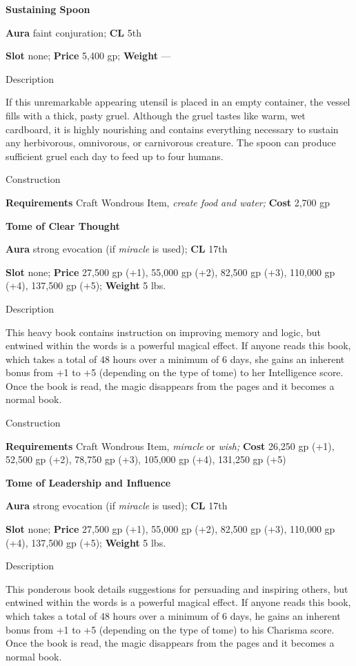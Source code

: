 \textbf{Sustaining Spoon}
				
\textbf{Aura} faint conjuration;\textbf{ CL }5th
				
\textbf{Slot} none; \textbf{Price} 5,400 gp; \textbf{Weight }---
				
Description
				
If this unremarkable appearing utensil is placed in an empty container, the vessel fills with a thick, pasty gruel. Although the gruel tastes like warm, wet cardboard, it is highly nourishing and contains everything necessary to sustain any herbivorous, omnivorous, or carnivorous creature. The spoon can produce sufficient gruel each day to feed up to four humans. 
				
Construction
				
\textbf{Requirements} Craft Wondrous Item, \textit{create food and water;}\textbf{ Cost }2,700 gp
				
\textbf{Tome of Clear Thought}
				
\textbf{Aura} strong evocation (if \textit{miracle} is used);\textbf{ CL }17th
				
\textbf{Slot} none; \textbf{Price} 27,500 gp (+1), 55,000 gp (+2), 82,500 gp (+3), 110,000 gp (+4), 137,500 gp (+5); \textbf{Weight} 5 lbs.
				
Description
				
This heavy book contains instruction on improving memory and logic, but entwined within the words is a powerful magical effect. If anyone reads this book, which takes a total of 48 hours over a minimum of 6 days, she gains an inherent bonus from +1 to +5 (depending on the type of tome) to her Intelligence score. Once the book is read, the magic disappears from the pages and it becomes a normal book. 
				
Construction
				
\textbf{Requirements} Craft Wondrous Item,\textit{ miracle }or\textit{ wish; }\textbf{Cost }26,250 gp (+1), 52,500 gp (+2), 78,750 gp (+3), 105,000 gp (+4), 131,250 gp (+5)
				
\textbf{Tome of Leadership and Influence}
				
\textbf{Aura} strong evocation (if \textit{miracle} is used);\textbf{ CL }17th
				
\textbf{Slot} none; \textbf{Price} 27,500 gp (+1), 55,000 gp (+2), 82,500 gp (+3), 110,000 gp (+4), 137,500 gp (+5); \textbf{Weight} 5 lbs.
				
Description
				
This ponderous book details suggestions for persuading and inspiring others, but entwined within the words is a powerful magical effect. If anyone reads this book, which takes a total of 48 hours over a minimum of 6 days, he gains an inherent bonus from +1 to +5 (depending on the type of tome) to his Charisma score. Once the book is read, the magic disappears from the pages and it becomes a normal book. 
				
